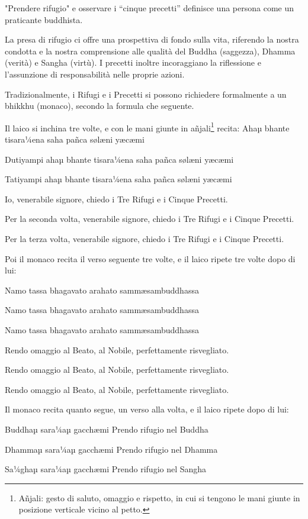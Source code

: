 

"Prendere rifugio" e osservare i “cinque precetti” definisce una persona
come un praticante buddhista.

La presa di rifugio ci offre una prospettiva di fondo sulla vita,
riferendo la nostra condotta e la nostra comprensione alle qualità del
Buddha (saggezza), Dhamma (verità) e Sangha (virtù). I precetti inoltre
incoraggiano la riflessione e l'assunzione di responsabilità nelle
proprie azioni.

Tradizionalmente, i Rifugi e i Precetti si possono richiedere
formalmente a un bhikkhu (monaco), secondo la formula che seguente.

Il laico si inchina tre volte, e con le mani giunte in
añjali\footnote{Añjali: gesto di saluto, omaggio e rispetto, in cui si
tengono le mani giunte in posizione verticale vicino al petto.} recita:
Ahaµ bhante tisara¼ena saha pañca sølæni yæcæmi

Dutiyampi ahaµ bhante tisara¼ena saha pañca sølæni yæcæmi

Tatiyampi ahaµ bhante tisara¼ena saha pañca sølæni yæcæmi

Io, venerabile signore, chiedo i Tre Rifugi e i Cinque Precetti.

Per la seconda volta, venerabile signore, chiedo i Tre Rifugi e i Cinque
Precetti.

Per la terza volta, venerabile signore, chiedo i Tre Rifugi e i Cinque
Precetti.

Poi il monaco recita il verso seguente tre volte, e il laico ripete tre
volte dopo di lui:

Namo tassa bhagavato arahato sammæsambuddhassa

Namo tassa bhagavato arahato sammæsambuddhassa

Namo tassa bhagavato arahato sammæsambuddhassa

Rendo omaggio al Beato, al Nobile, perfettamente risvegliato.

Rendo omaggio al Beato, al Nobile, perfettamente risvegliato.

Rendo omaggio al Beato, al Nobile, perfettamente risvegliato.

Il monaco recita quanto segue, un verso alla volta, e il laico ripete
dopo di lui:

Buddhaµ sara¼aµ gacchæmi Prendo rifugio nel Buddha

Dhammaµ sara¼aµ gacchæmi Prendo rifugio nel Dhamma

Sa¼ghaµ sara¼aµ gacchæmi Prendo rifugio nel Sangha

